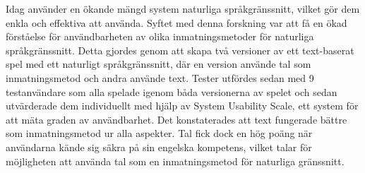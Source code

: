 Idag använder en ökande mängd system naturliga språkgränssnitt, vilket gör dem enkla och effektiva att använda. Syftet med denna forskning var att få en ökad förståelse för användbarheten av olika inmatningsmetoder för naturliga språkgränssnitt. Detta gjordes genom att skapa två versioner av ett text-baserat spel med ett naturligt språkgränssnitt, där en version använde tal som inmatningsmetod och andra använde text. Tester utfördes sedan med 9 testanvändare som alla spelade igenom båda versionerna av spelet och sedan utvärderade dem individuellt med hjälp av System Usability Scale, ett system för att mäta graden av användbarhet. Det konstaterades att text fungerade bättre som inmatningsmetod ur alla aspekter. Tal fick dock en hög poäng när användarna kände sig säkra på sin engelska kompetens, vilket talar för möjligheten att använda tal som en inmatningsmetod för naturliga gränssnitt.